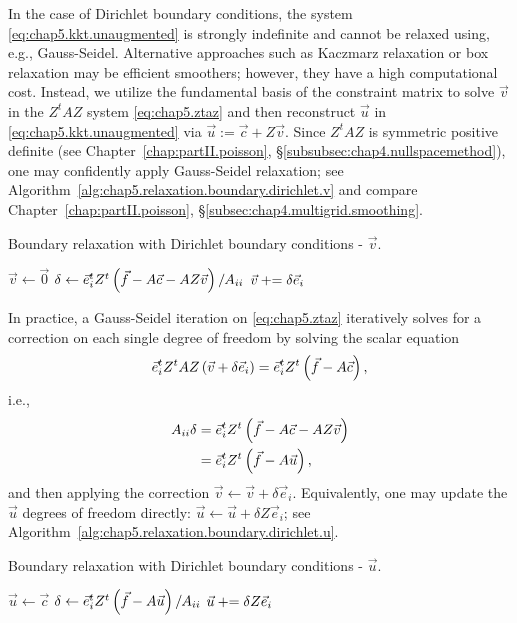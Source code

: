 In the case of Dirichlet boundary conditions, the system \eqref{eq:chap5.kkt.unaugmented} is strongly indefinite and cannot be relaxed using, e.g., Gauss-Seidel. Alternative approaches such as Kaczmarz relaxation or box relaxation may be efficient smoothers; however, they have a high computational cost. Instead, we utilize the fundamental basis of the constraint matrix to solve $\vec{v}$ in the $Z^tAZ$ system \eqref{eq:chap5.ztaz} and then reconstruct $\vec{u}$ in \eqref{eq:chap5.kkt.unaugmented} via $\vec{u} := \vec{c} + Z \vec{v}$. Since $Z^tAZ$ is symmetric positive definite (see Chapter~\ref{chap:partII.poisson}, \S\ref{subsubsec:chap4.nullspacemethod}), one may confidently apply Gauss-Seidel relaxation; see Algorithm~\ref{alg:chap5.relaxation.boundary.dirichlet.v} and compare Chapter~\ref{chap:partII.poisson}, \S\ref{subsec:chap4.multigrid.smoothing}.

\begin{algorithm}[htbp]
\caption{Boundary relaxation with Dirichlet boundary conditions - $\vec{v}$.}
\label{alg:chap5.relaxation.boundary.dirichlet.v}
\begin{algorithmic}[1]
\STATE $\vec{v} \leftarrow \vec{0}$
    \STATE $\delta \leftarrow \vec{e}_i^t Z^t \left( \vec{f} - A \vec{c} - AZ \vec{v} \right) / A_{ii}$
    \STATE $\vec{v} +{}\!\!\!= \delta \vec{e}_i$
\ENDFOR
\end{algorithmic}
\end{algorithm}

In practice, a Gauss-Seidel iteration on \eqref{eq:chap5.ztaz} iteratively solves for a correction on each single degree of freedom by solving the scalar equation
\begin{equation*}
\vec{e}_i^t Z^tAZ \left( \vec{v} + \delta \vec{e}_i \right) = \vec{e}_i^t Z^t \left( \vec{f} - A \vec{c} \right),
\end{equation*}
i.e.,
\begin{align*}
A_{ii} \delta & = \vec{e}_i^t Z^t \left( \vec{f} - A \vec{c} - A Z \vec{v} \right) \\
              & = \vec{e}_i^t Z^t \left( \vec{f} - A \vec{u} \right),
\end{align*}
and then applying the correction $\vec{v} \leftarrow \vec{v} + \delta \vec{e}_i$. Equivalently, one may update the $\vec{u}$ degrees of freedom directly: $\vec{u} \leftarrow \vec{u} + \delta Z \vec{e}_i$; see Algorithm~\ref{alg:chap5.relaxation.boundary.dirichlet.u}.

\begin{algorithm}[htbp]
\caption{Boundary relaxation with Dirichlet boundary conditions - $\vec{u}$.}
\label{alg:chap5.relaxation.boundary.dirichlet.u}
\begin{algorithmic}[1]
\STATE $\vec{u} \leftarrow \vec{c}$
    \STATE $\delta \leftarrow \vec{e}_i^t Z^t \left( \vec{f} - A \vec{u} \right) / A_{ii}$
    \STATE $\vec{u} +{}\!\!\!= \delta Z \vec{e}_i$
\ENDFOR
\end{algorithmic}
\end{algorithm}

